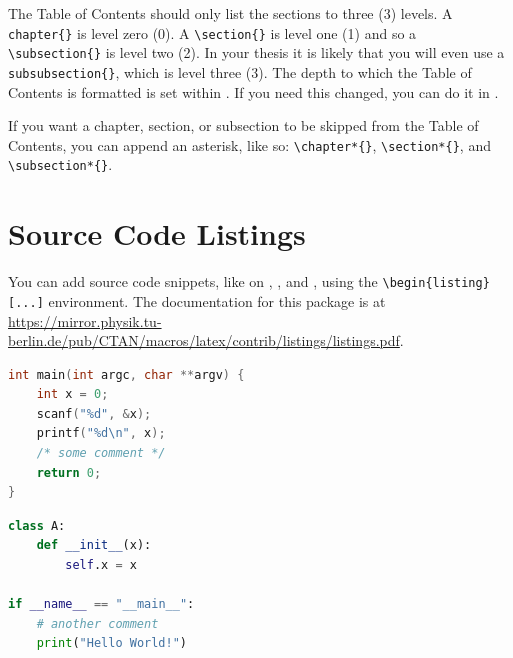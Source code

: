 The Table of Contents should only list the sections to three (3) levels.
A \verb|chapter{}| is level zero (0). A \verb|\section{}| is level one (1) and so a \verb|\subsection{}| is level two (2). In your thesis it is likely that you will even use a \verb|subsubsection{}|, which is level three (3).
The depth to which the Table of Contents is formatted is set within .  
If you need this changed, you can do it in .

If you want a chapter, section, or subsection to be skipped from the Table of Contents, you can append an asterisk, like so: \verb|\chapter*{}|, \verb|\section*{}|, and \verb|\subsection*{}|.


\section{Source Code Listings}
You can add source code snippets, like on , , and , using the \verb|\begin{listing}[...]| environment.
The documentation for this package is at \url{https://mirror.physik.tu-berlin.de/pub/CTAN/macros/latex/contrib/listings/listings.pdf}.

\begin{lstlisting}[language=C, caption={C code snippet}, label=lst:c]
int main(int argc, char **argv) {
    int x = 0;
    scanf("%d", &x);
    printf("%d\n", x);
    /* some comment */
    return 0;
}
\end{lstlisting}

\begin{lstlisting}[language=Python, caption={Python code snippet}, label=lst:py]
class A:
    def __init__(x):
        self.x = x

if __name__ == "__main__":
    # another comment
    print("Hello World!")
\end{lstlisting}

